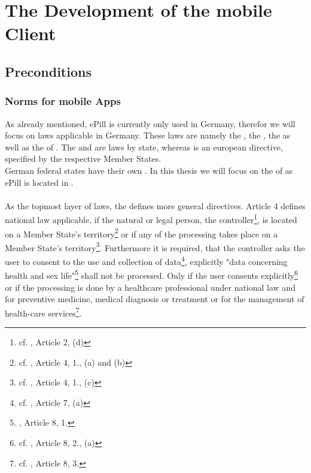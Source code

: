 \section{The Development of the mobile Client}
\subsection{Preconditions}
\subsubsection{Norms for mobile Apps}
As already mentioned, ePill is currently only used in Germany, therefor we will focus on laws applicable in Germany. These laws are namely the \TKGns, the \TMGns, the \REG as well as the \DPA of \NRWns. The \TKG and \TMG are laws by state, whereas \REG is an european directive, specified by the respective Member States. 
\\
German federal states have their own \DPAsns. In this thesis we will focus on the \DPA of \NRW as ePill is located in \NRWns.
\\
\\
As the topmost layer of laws, the \REG defines more general directives. Article 4 defines national law applicable, if the natural or legal person, the controller\footnote{cf. \cite{TheEuropeanParliamentandtheCounciloftheEuropeanUnion.24.10.1995}, Article 2, (d)}, is located on a Member State's territory\footnote{cf. \cite{TheEuropeanParliamentandtheCounciloftheEuropeanUnion.24.10.1995}, Article 4, 1., (a) and (b)} or if any of the processing takes place on a Member State's territory\footnote{cf. \cite{TheEuropeanParliamentandtheCounciloftheEuropeanUnion.24.10.1995}, Article 4, 1., (c)}. Furthermore it is required, that the controller asks the user to consent to the use and collection of data\footnote{cf. \cite{TheEuropeanParliamentandtheCounciloftheEuropeanUnion.24.10.1995}, Article 7, (a)}, explicitly "data concerning health and sex life"\footnote{\cite{TheEuropeanParliamentandtheCounciloftheEuropeanUnion.24.10.1995}, Article 8, 1.} shall not be processed. Only if the user consents explicitly\footnote{cf. \cite{TheEuropeanParliamentandtheCounciloftheEuropeanUnion.24.10.1995}, Article 8, 2., (a)} or if the processing is done by a healthcare professional under national law and for preventive medicine, medical diagnosis or treatment or for the management of health-care services\footnote{cf. \cite{TheEuropeanParliamentandtheCounciloftheEuropeanUnion.24.10.1995}, Article 8, 3.}. 
\\
